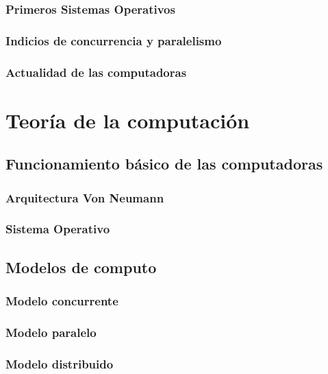 \documentclass[letterpaper,12pt,oneside]{book}
\begin{document}
		\clearpage		
		
		\subsection{Primeros Sistemas Operativos}
		
		\subsection{Indicios de concurrencia y paralelismo}
	
		\subsection{Actualidad de las computadoras}
		

\chapter{Teoría de la computación} %

	\section{Funcionamiento básico de las computadoras}   %
		
		\subsection{Arquitectura Von Neumann}   
	
		\subsection{Sistema Operativo}   	

	\section{Modelos de computo}

		\subsection{Modelo concurrente}

		\subsection{Modelo paralelo}
	
		\subsection{Modelo distribuido}
\end{document}
